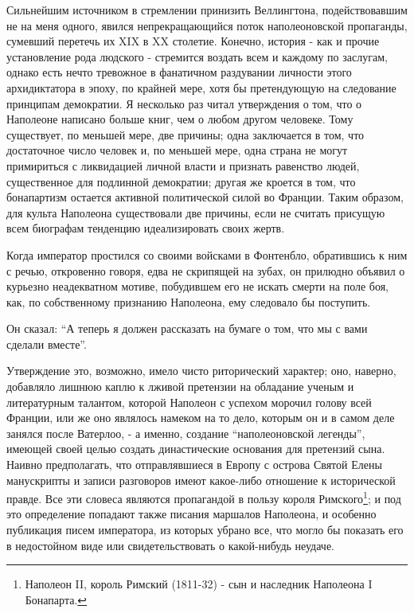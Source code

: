\documentclass[
  oneside,
  12pt,
  titlepage]{book}
\begin{document}
Сильнейшим источником в стремлении принизить Веллингтона, подействовавшим не на меня одного, явился непрекращающийся поток наполеоновской пропаганды, сумевший перетечь их XIX в XX столетие. Конечно, история - как и прочие установление рода людского - стремится воздать всем и каждому по заслугам, однако есть нечто тревожное в фанатичном раздувании личности этого архидиктатора в эпоху, по крайней мере, хотя бы претендующую на следование принципам демократии. Я несколько раз читал утверждения о том, что о Наполеоне написано больше книг, чем о любом другом человеке. Тому существует, по меньшей мере, две причины; одна заключается в том, что достаточное число человек и, по меньшей мере, одна страна не могут примириться с ликвидацией личной власти и признать равенство людей, существенное для подлинной демократии; другая же кроется в том, что бонапартизм остается активной политической силой во Франции. Таким образом, для культа Наполеона существовали две причины, если не считать присущую всем биографам тенденцию идеализировать своих жертв.

Когда император простился со своими войсками в Фонтенбло, обратившись к ним с речью, откровенно говоря, едва не скрипящей на зубах, он прилюдно объявил о курьезно неадекватном мотиве, побудившем его не искать смерти на поле боя, как, по собственному признанию Наполеона, ему следовало бы поступить.

Он сказал: ``А теперь я должен рассказать на бумаге о том, что мы с вами сделали вместе''.

Утверждение это, возможно, имело чисто риторический характер; оно, наверно, добавляло лишнюю каплю к лживой претензии на обладание ученым и литературным талантом, которой Наполеон с успехом морочил голову всей Франции, или же оно являлось намеком на то дело, которым он и в самом деле занялся после Ватерлоо, - а именно, создание ``наполеоновской легенды'', имеющей своей целью создать династические основания для претензий сына. Наивно предполагать, что отправлявшиеся в Европу с острова Святой Елены манускрипты и записи разговоров имеют какое-либо отношение к исторической правде. Все эти словеса являются пропагандой в пользу короля Римского\footnote{Наполеон II, король Римский (1811-32) - сын и наследник Наполеона I Бонапарта.}; и под это определение попадают также писания маршалов Наполеона, и особенно публикация писем императора, из которых убрано все, что могло бы показать его в недостойном виде или свидетельствовать о какой-нибудь неудаче.
\end{document}
